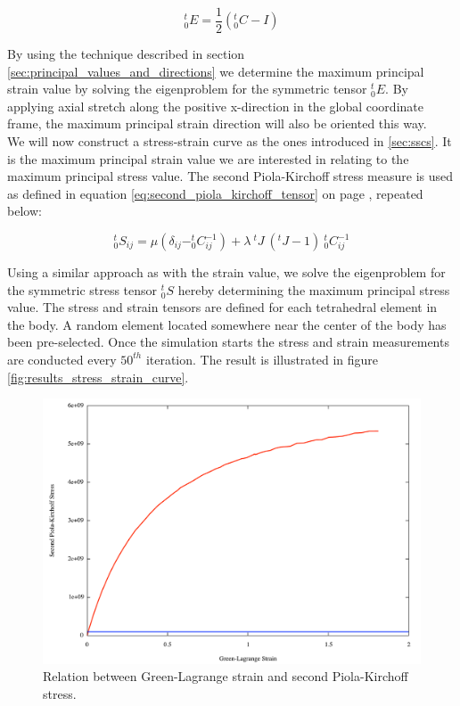 \begin{equation*}
^t_0E = \frac{1}{2}(^t_0C - I)
\end{equation*}

By using the technique described in section
\vref{sec:principal_values_and_directions} we determine the maximum
principal strain value by solving the eigenproblem for the symmetric
tensor $^t_0E$. By applying axial stretch along the positive
x-direction in the global coordinate frame, the maximum principal
strain direction will also be oriented this way. \\

We will now construct a stress-strain curve as the ones introduced in
\vref{sec:sscs}.
It is the maximum principal strain value we are interested in relating
to the maximum principal stress value. The second Piola-Kirchoff
stress measure is used as defined in 
equation \eqref{eq:second_piola_kirchoff_tensor} on page
\pageref{eq:second_piola_kirchoff_tensor}, repeated below:

\begin{equation*}
^t_0S_{ij} = \mu(\delta_{ij} - ^t_0C_{ij}^{-1}) + \lambda \ ^tJ \ (^tJ-1) \ ^t_0C_{ij}^{-1}
\end{equation*}

Using a similar approach as with the strain value, we solve the
eigenproblem for the symmetric stress tensor $^t_0S$ hereby
determining the maximum principal stress value. The stress and strain
tensors are defined for each tetrahedral element in the body. A random
element located somewhere near the center of the body has been pre-selected.
Once the simulation starts the stress and strain measurements are
conducted every $50^{th}$ iteration. The result is illustrated in
figure \vref{fig:results_stress_strain_curve}.

\begin{figure}
    \centering
    \includegraphics[width=140mm]{./images/results_ssc_dentine_large.pdf}
    \caption{Relation between Green-Lagrange strain and second
      Piola-Kirchoff stress.}
\label{fig:results_stress_strain_curve}
\end{figure}

